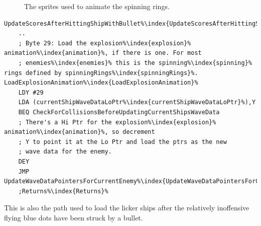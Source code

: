\begin{figure}[H]
  {
    \setlength{\tabcolsep}{1.0pt}
    \setlength\cmidrulewidth{\heavyrulewidth} %
	\centering
	\def\MULTICOLORONE{white}
	\def\MULTICOLORTWO{yellow}
	\def\SPRITECOLOR{yellow}
	\begin{subfigure}{0.23\textwidth}
		
	\end{subfigure}
	\begin{subfigure}{0.23\textwidth}
		
	\end{subfigure}
	\begin{subfigure}{0.23\textwidth}
		
	\end{subfigure}
	\begin{subfigure}{0.23\textwidth}
		
	\end{subfigure}
  }\caption[position=top]{The sprites used to animate the spinning rings.}
\end{figure}

\begin{lstlisting}[escapechar=\%]
UpdateScoresAfterHittingShipWithBullet%\index{UpdateScoresAfterHittingShipWithBullet}%
    ..
    ; Byte 29: Load the explosion%\index{explosion}% animation%\index{animation}%, if there is one. For most
    ; enemies%\index{enemies}% this is the spinning%\index{spinning}% rings defined by spinningRings%\index{spinningRings}%.
LoadExplosionAnimation%\index{LoadExplosionAnimation}%   
    LDY #29
    LDA (currentShipWaveDataLoPtr%\index{currentShipWaveDataLoPtr}%),Y
    BEQ CheckForCollisionsBeforeUpdatingCurrentShipsWaveData
    ; There's a Hi Ptr for the explosion%\index{explosion}% animation%\index{animation}%, so decrement
    ; Y to point it at the Lo Ptr and load the ptrs as the new
    ; wave data for the enemy.
    DEY
    JMP UpdateWaveDataPointersForCurrentEnemy%\index{UpdateWaveDataPointersForCurrentEnemy}%
    ;Returns%\index{Returns}%
\end{lstlisting}

This is also the path used to load the licker ships after the relatively inoffensive flying blue dots have
been struck by a bullet.

